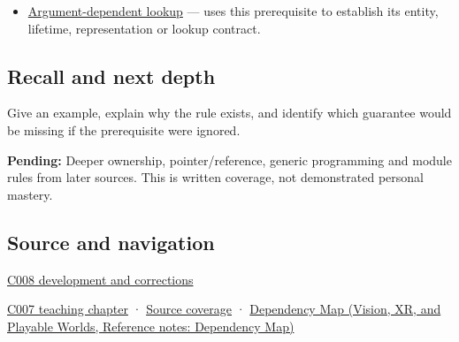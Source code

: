 \hypertarget{appendix-b12b31759da1-used-by}{}

\begin{itemize}
\tightlist
\item
  \hyperref[appendix-7863714aa97f]{Argument-dependent lookup} --- uses this prerequisite to establish its entity, lifetime, representation or lookup contract.
\end{itemize}

\subsection{Recall and next depth}\label{appendix-b12b31759da1-recall-and-next-depth}

\hypertarget{appendix-b12b31759da1-recall-and-next-depth}{}

Give an example, explain why the rule exists, and identify which guarantee would be missing if the prerequisite were ignored.

\textbf{Pending:} Deeper ownership, pointer/reference, generic programming and module rules from later sources. This is written coverage, not demonstrated personal mastery.

\subsection{Source and navigation}\label{appendix-b12b31759da1-source-and-navigation}

\hypertarget{appendix-b12b31759da1-source-and-navigation}{}

\hyperref[appendix-fd090d982a15-m008---parts-113-126]{C008 development and corrections}

\hyperref[01-foundations-i-ch002-a-spelling-needs-a-place-and-a-meaning]{C007 teaching chapter} · \hyperref[appendix-fd090d982a15-m007---parts-101-112]{Source coverage} · \href{../07-Vision-XR-and-Playable-Worlds/main.pdf\#nameddest=appendix-4ad47bdd269a}{Dependency Map (Vision, XR, and Playable Worlds, Reference notes: Dependency Map)}
